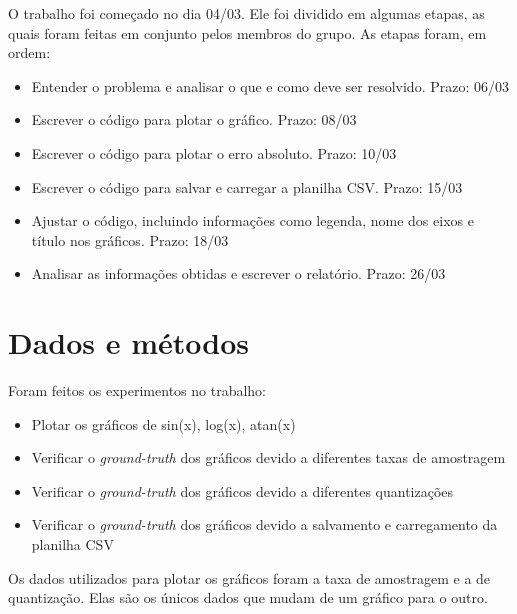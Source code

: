 \documentclass[12pt]{article}
\begin{document}
O trabalho foi começado no dia 04/03. Ele foi dividido em algumas etapas, as quais foram feitas em conjunto pelos membros do grupo.
As etapas foram, em ordem:

\begin{itemize}
\item Entender o problema e analisar o que e como deve ser resolvido. Prazo: 06/03

\item Escrever o código para plotar o gráfico. Prazo: 08/03

\item Escrever o código para plotar o erro absoluto. Prazo: 10/03

\item Escrever o código para salvar e carregar a planilha CSV. Prazo: 15/03

\item Ajustar o código, incluindo informações como legenda, nome dos eixos e título nos gráficos. Prazo: 18/03

\item Analisar as informações obtidas e escrever o relatório. Prazo: 26/03

\end{itemize}

\section{Dados e métodos}

Foram feitos os experimentos no trabalho:
\begin{itemize}

\item Plotar os gráficos de sin(x), log(x), atan(x)

\item Verificar o \textit{ground-truth} dos gráficos devido a diferentes taxas de amostragem

\item Verificar o \textit{ground-truth} dos gráficos devido a diferentes quantizações

\item Verificar o \textit{ground-truth} dos gráficos devido a salvamento e carregamento da planilha CSV

\end{itemize}

Os dados utilizados para plotar os gráficos foram a taxa de amostragem e a de quantização. Elas são os únicos dados que mudam de um gráfico para o outro.
\end{document}
